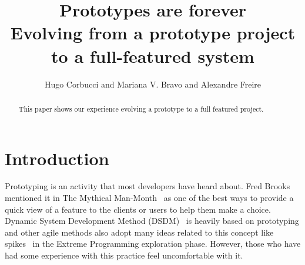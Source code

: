 \documentclass[lnbip]{svmultln}
\begin{document}
%
\mainmatter %
%
\title{Prototypes are forever\\
  Evolving from a prototype project\\ to a full-featured system}
%
%
\author{Hugo Corbucci and Mariana V. Bravo  and
  Alexandre Freire}
%
%
%

\maketitle %

\begin{abstract} %

  This paper shows our experience evolving a prototype to a full
  featured project.
\end{abstract}
%
\section{Introduction}

Prototyping is an activity that most developers have heard about. Fred
Brooks mentioned it in The Mythical Man-Month~\cite{Brooks1975} as one
of the best ways to provide a quick view of a feature to the clients
or users to help them make a choice. Dynamic System Development Method
(DSDM)~\cite{DSDM} is heavily based on prototyping and other agile
methods also adopt many ideas related to this concept like
spikes~\cite{XP} in the Extreme Programming exploration
phase. However, those who have had some experience with this practice
feel uncomfortable with it\cite{quem disse? esse tipo de afirmação é
  sempre bom ter uma citação, já apanhei bastante sobre isso.  ale}.
\end{document}

